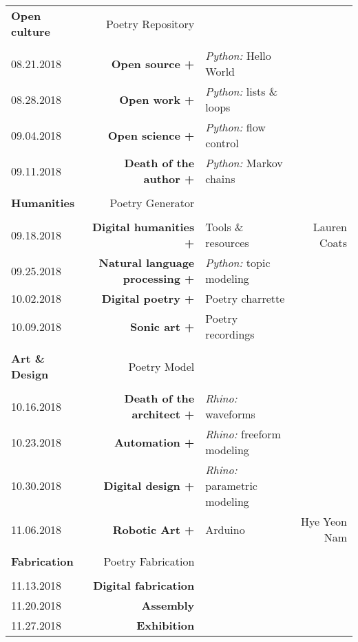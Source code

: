 \documentclass[11pt,article,oneside]{memoir}
\begin{document}
\begin{table}[H]
\begin{tabular}{l r @{\hskip 0.1cm} l r}
\\
\normalsize
\textbf{Open culture} & Poetry Repository\\
\small
\\
08.21.2018 & \textbf{Open source +} & \emph{Python:} Hello World \\
08.28.2018 & \textbf{Open work +} & \emph{Python:} lists \& loops \\
09.04.2018 & \textbf{Open science +} & \emph{Python:} flow control \\ 
09.11.2018 & \textbf{Death of the author +} & \emph{Python:} Markov chains \\ 
\\
\normalsize

\textbf{Humanities} & Poetry Generator\\
\small
\\
09.18.2018 & \textbf{Digital humanities +} & Tools \& resources  & Lauren Coats \\
09.25.2018 & \textbf{Natural language processing +} & \emph{Python:} topic modeling \\
10.02.2018 & \textbf{Digital poetry +} & Poetry charrette \\ 
10.09.2018 & \textbf{Sonic art +} & Poetry recordings \\ 
\\
\normalsize
\textbf{Art \& Design} & Poetry Model \\
\small
\\
10.16.2018 & \textbf{Death of the architect +} & \emph{Rhino:} waveforms \\
10.23.2018 & \textbf{Automation +} & \emph{Rhino:} freeform modeling \\
10.30.2018 & \textbf{Digital design +} & \emph{Rhino:} parametric modeling \\
11.06.2018 & \textbf{Robotic Art +} & Arduino & Hye Yeon Nam \\
\\
\normalsize
\textbf{Fabrication} & Poetry Fabrication\\
\small
\\
11.13.2018 & \textbf{Digital fabrication} \\
11.20.2018 & \textbf{Assembly} \\
11.27.2018 & \textbf{Exhibition} \\ 
%
\end{tabular}
\end{table}
\end{document}
